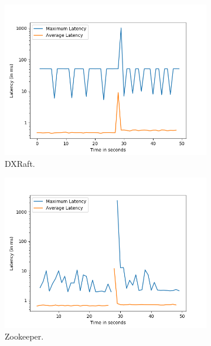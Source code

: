 \begin{figure}[t]
	\centering
	\begin{subfigure}[t]{0.45\textwidth}
		\includegraphics[width=\textwidth]{img/leader_crash_dxraft.png}
		\caption{DXRaft.}
	\end{subfigure}
	\begin{subfigure}[t]{0.45\textwidth}
		\includegraphics[width=\textwidth]{img/leader_crash_zk.png}
		\caption{Zookeeper.}
	\end{subfigure}
	\begin{subfigure}[t]{0.45\textwidth}

\end{subfigure}
\end{figure}
